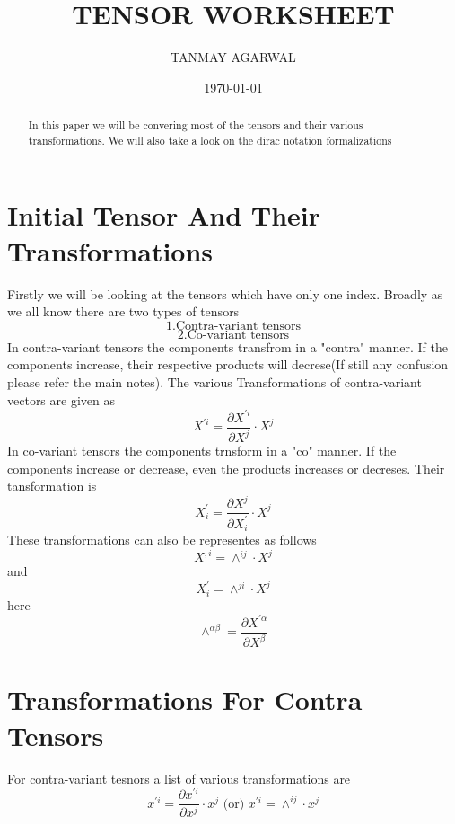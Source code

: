 \documentclass{article}
\begin{document}
\normalsize
\title{TENSOR WORKSHEET}
\author{TANMAY AGARWAL}
\date{\today}
\maketitle
\begin{abstract}
In this paper we will be convering most of the tensors and their various transformations. We will also take a look on the dirac notation formalizations
\end{abstract}
\tableofcontents
\section{Initial Tensor And Their Transformations}
Firstly we will be looking at the tensors which have only one index. Broadly as we all know there are two types of tensors 
\begin{equation*}
\text{1.Contra-variant tensors}
\end{equation*}
\begin{equation*}
\text{2.Co-variant tensors}
\end{equation*}
In contra-variant tensors the components transfrom in a "contra" manner. If the components increase, their respective products will decrese(If still any confusion please refer the main notes).
The various Transformations of contra-variant vectors are given as 
\begin{equation}
X^{'i}=\frac{\partial X^{'i}}{\partial X^j}\cdot X^j
\end{equation}
In co-variant tensors the components trnsform in a "co" manner. If the components increase or decrease, even the products increases or decreses. Their tansformation is 
\begin{equation}
X_i^{'}=\frac{\partial X^j}{\partial X_i^{'}}\cdot X^j
\end{equation}
These transformations can also be representes as follows 
\begin{equation}
X^{,i}=\wedge^{ij}\cdot X^j
\end{equation}
and 
\begin{equation}
X_i^{'}=\wedge^{ji}\cdot X^j
\end{equation}
here 
\begin{equation}
\wedge^{\alpha \beta}=\frac{\partial X^{'\alpha}}{\partial X^\beta}
\end{equation}
\section{Transformations For Contra Tensors}
For contra-variant tesnors a list of various transformations are
\begin{equation}
x^{'i}=\frac{\partial x^{'i}}{\partial x^j}\cdot x^j \,\,\text{(or)}\,\, x^{'i}=\wedge^{ij}\cdot x^j 
\end{equation}
\end{document}
